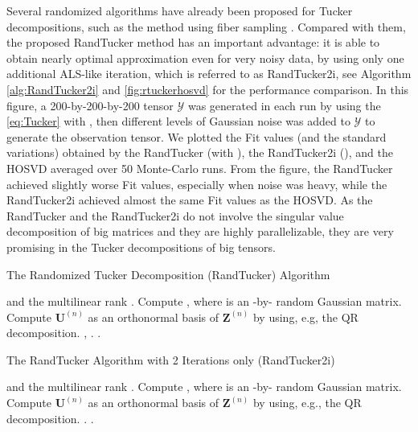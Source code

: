 \documentclass[10pt,twocolumn,twoside]{IEEEtran}
\newcommand{\tensor}[1]{\ensuremath{\boldsymbol{\mathscr{#1}}}}
\newcommand{\matn}[2][n]{\ensuremath{\mathbf{#2}^{(#1)}}}
\renewcommand{\from}{\ensuremath{\leftarrow}}
\begin{document}
Several randomized algorithms have already been proposed for Tucker decompositions, such as the method using fiber sampling \cite{CURTensorCaiafaC2010,spm2014_Incomplete}. Compared with them, the proposed RandTucker method has an important advantage: it is able to obtain nearly optimal approximation even for very noisy data, by using only one additional ALS-like iteration, which is referred to as RandTucker2i, see Algorithm \ref{alg:RandTucker2i} and \figurename \ref{fig:rtuckerhosvd} for the performance comparison. In this figure, a 200-by-200-by-200 tensor \tensor{Y} was generated in each run by using the \eqref{eq:Tucker} with , then different levels of Gaussian noise was added to \tensor{Y}  to generate the observation tensor. We plotted the Fit values (and the standard variations) obtained by the RandTucker (with ), the RandTucker2i (), and the HOSVD averaged over 50 Monte-Carlo runs. From the figure, the RandTucker achieved slightly worse Fit values, especially when noise  was heavy, while the RandTucker2i achieved almost the same Fit values as the HOSVD. As the RandTucker and the RandTucker2i do not involve the singular value decomposition of big matrices and they are highly parallelizable, they are very promising in the Tucker decompositions of big tensors.



\begin{algorithm}[!t]
\caption{The Randomized Tucker Decomposition (RandTucker) Algorithm}
\label{alg:RandTucker}
\begin{algorithmic}[1]
 \REQUIRE  and the multilinear rank  .
\FOR{}
\STATE Compute  , where  is an -by- random Gaussian matrix.
\STATE Compute \matn{U} as an orthonormal basis of \matn{Z} by using, e.g, the QR decomposition.
\STATE , .
\ENDFOR
\STATE{\tensor{G}\from\tensor{Y}.}
\RETURN .
\end{algorithmic}
\end{algorithm} 


\begin{algorithm}[!t]
\caption{The RandTucker Algorithm with 2 Iterations only (RandTucker2i)}
\label{alg:RandTucker2i}
\begin{algorithmic}[1]
 \REQUIRE  and the multilinear rank  .
\FOR{}
\STATE Compute  , where  is an -by- random Gaussian matrix.
\STATE Compute \matn{U} as an orthonormal basis of \matn{Z} by using, e.g., the QR decomposition.
\ENDFOR
\STATE{}.
\RETURN .
\end{algorithmic}
\end{algorithm} 
\end{document}
